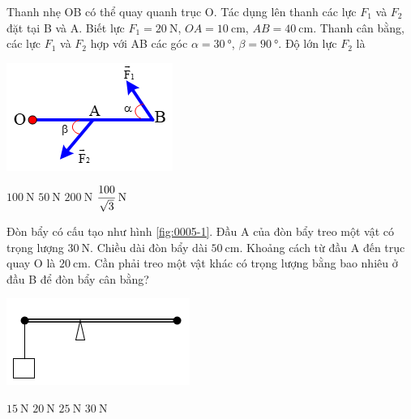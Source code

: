 \begin{ex}
	Thanh nhẹ OB có thể quay quanh trục O. Tác dụng lên thanh các lực $F_1$ và $F_2$ đặt tại B và A. Biết lực $F_1=\SI{20}{\newton}$, $OA=\SI{10}{\centi\meter}$, $AB=\SI{40}{\centi\meter}$. Thanh cân bằng, các lực $F_1$ và $F_2$ hợp với AB các góc $\alpha=\SI{30}{\degree}$, $\beta=\SI{90}{\degree}$. Độ lớn lực $F_2$ là
	\begin{center}
		\includegraphics[width=0.25\linewidth]{../figs/VN10-2023-PH-TP0005-8}
	\end{center}
	\choice
	{$\SI{100}{\newton}$}
	{\True $\SI{50}{\newton}$}
	{$\SI{200}{\newton}$}
	{$\xsi{\dfrac{100}{\sqrt{3}}}{\newton}$}
\end{ex}
\begin{ex}
Đòn bẩy có cấu tạo như hình \ref{fig:0005-1}. Đầu A của đòn bẩy treo một vật có trọng lượng $\SI{30}{\newton}$. Chiều dài đòn bẩy dài $\SI{50}{\centi\meter}$. Khoảng cách từ đầu A đến trục quay O là $\SI{20}{\centi\meter}$. Cần phải treo một vật khác có trọng lượng bằng bao nhiêu ở đầu B để đòn bẩy cân bằng?
\begin{center}
	\includegraphics[width=0.35\linewidth]{../figs/VN10-2023-PH-TP0005-1}
	\label{fig:0005-1}
\end{center}	
	\choice
	{$\SI{15}{\newton}$}
	{\True $\SI{20}{\newton}$}
	{$\SI{25}{\newton}$}
	{$\SI{30}{\newton}$}
\end{ex}
